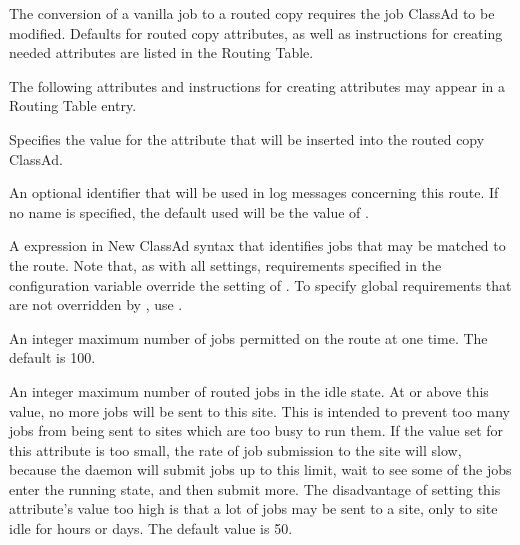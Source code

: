 The conversion of a vanilla job to a routed copy requires the
job ClassAd to be modified.
Defaults for routed copy attributes,
as well as instructions for creating needed attributes 
are listed in the Routing Table.

The following attributes and instructions for creating attributes
may appear in a Routing Table entry.

\begin{description}

\item[GridResource] Specifies the value for the 
attribute that will be inserted into the routed copy ClassAd.

\item[Name] An optional identifier that will be used in log
messages concerning this route.  If no name is specified, the default
used will be the value of .

\item[Requirements] A  expression in New ClassAd
syntax that identifies jobs that may be matched to the route.  Note
that, as with all settings, requirements specified in
the configuration variable
 override the setting of
.  To specify global requirements that
are not overridden by , use
.

\item[MaxJobs] An integer maximum number of jobs permitted on the route at
one time. The default is 100.

\item[MaxIdleJobs] An integer maximum number of routed jobs in the
idle state.  At or above this value, no more jobs will be sent
to this site.
This is intended to prevent too many jobs from being sent to sites
which are too busy to run them.
If the value set for this attribute is too small,
the rate of job submission to the site will slow,
because the  daemon will submit jobs up to this limit,
wait to see some of the jobs enter the running state,
and then submit more.
The disadvantage of setting this attribute's value too high
is that a lot of jobs may be sent
to a site, only to site idle for hours or days.
The default value is 50.


\end{description}
